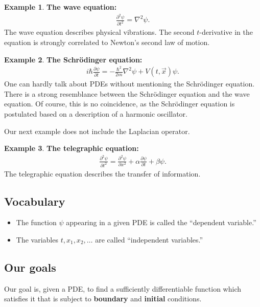 \documentclass{article}
\theoremstyle{definition}
\newtheorem{exmp}{Example}[section]
\begin{document}
\begin{exmp}
	\textbf{The wave equation:}
	\begin{align*}
	\frac{\partial^2 \psi}{\partial t^2} = \nabla^2 \psi.
	\end{align*}
	The wave equation describes physical vibrations. The second $t$-derivative in the equation is strongly correlated to Newton's second law of motion.
\end{exmp}

\begin{exmp}
	\textbf{The Schr\"{o}dinger equation:}
	\begin{align*}
	i\hbar \frac{\partial \psi}{\partial t} = -\frac{\hbar^2}{2m}\nabla^2\psi + V(t,\vec{x})\psi.
	\end{align*}
	One can hardly talk about PDEs without mentioning the Schr\"{o}dinger equation. There is a strong resemblance between the Schr\"{o}dinger equation and the wave equation. Of course, this is no coincidence, as the Schr\"{o}dinger equation is postulated based on a description of a harmonic oscillator.  
\end{exmp}

Our next example does not include the Laplacian operator. 

\begin{exmp}
	\textbf{The telegraphic equation:}
	\begin{align*}
	\frac{\partial^2 \psi}{\partial t^2} = \frac{\partial^2 \psi}{\partial x^2} + \alpha \frac{\partial \psi}{\partial t} + \beta \psi.
	\end{align*}
	The telegraphic equation describes the transfer of information. 
\end{exmp}

\subsection{Vocabulary}
\begin{itemize}
	\item The function $\psi$ appearing in a given PDE is called the ``dependent variable.''
	\item The variables $t,x_1,x_2,\dots$ are called ``independent variables.''
\end{itemize}

\subsection{Our goals}
Our goal is, given a PDE, to find a sufficiently differentiable function which satisfies it that is subject to \textbf{boundary} and \textbf{initial} conditions. 
\end{document}
